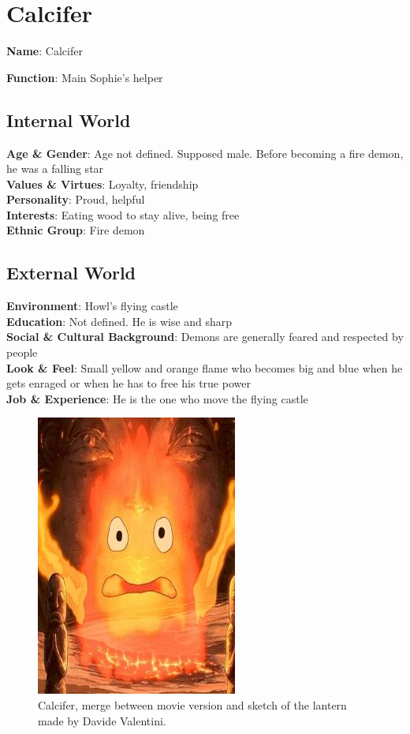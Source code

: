 \section{Calcifer}

\begin{minipage}{0.5\textwidth}
\textbf{Name}: Calcifer

\textbf{Function}: Main Sophie's helper

\subsection{Internal World}

\textbf{Age \& Gender}: Age not defined. Supposed male. Before becoming a fire demon, he was a falling star \\
\textbf{Values \& Virtues}: Loyalty, friendship \\
\textbf{Personality}: Proud, helpful \\
\textbf{Interests}: Eating wood to stay alive, being free \\
\textbf{Ethnic Group}: Fire demon

\subsection{External World}
\textbf{Environment}: Howl's flying castle \\
\textbf{Education}: Not defined. He is wise and sharp \\
\textbf{Social \& Cultural Background}: Demons are generally feared and respected by people \\
\textbf{Look \& Feel}: Small yellow and orange flame who becomes big and  blue when he gets enraged or when he has to free his true power\\
\textbf{Job \& Experience}: He is the one who move the flying castle \\

\end{minipage}%
%
\hfill\begin{minipage}{0.4\textwidth}
  \begin{figure}[H]
    \includegraphics{Images/Characters/calcifer}
    \caption{Calcifer, merge between movie version and sketch of the lantern made by Davide Valentini.}
\end{figure}
\end{minipage}


